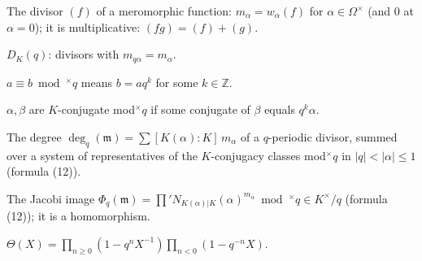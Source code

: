 \begin{definition}
\label{def:divisor-of}
\leanok
The divisor $(f)$ of a meromorphic function: $m_\alpha=w_\alpha(f)$ for $\alpha\in\Omega^\times$ (and $0$ at $\alpha=0$); it is multiplicative: $(fg)=(f)+(g)$.
\end{definition}

\begin{definition}
\label{def:Dq}
\leanok
$D_K(q)$: divisors with $m_{q\alpha}=m_\alpha$.
\end{definition}

\begin{definition}
\label{def:mod-times}
\leanok
$a\equiv b\bmod^\times q$ means $b=aq^k$ for some $k\in\mathbb Z$.
\end{definition}

\begin{definition}
\label{def:conj-mod-q}
\leanok
$\alpha,\beta$ are $K$-conjugate mod$^\times q$ if some conjugate of $\beta$ equals $q^k\alpha$.
\end{definition}

\begin{definition}
\label{def:deg-q}
\leanok
The degree $\deg_q(\mathfrak m)=\sum[K(\alpha):K]\,m_\alpha$ of a $q$-periodic divisor, summed over a system of representatives of the $K$-conjugacy classes mod$^\times q$ in $|q|<|\alpha|\le 1$ (formula (12)).
\end{definition}

\begin{definition}
\label{def:Phi-q}
\leanok
The Jacobi image $\Phi_q(\mathfrak m)=\prod' N_{K(\alpha)|K}(\alpha)^{m_\alpha}\bmod^\times q\in K^\times/q$ (formula (12)); it is a homomorphism.
\end{definition}

\begin{definition}
\label{def:theta}
\leanok
$\Theta(X)=\prod_{n\ge 0}(1-q^nX^{-1})\prod_{n<0}(1-q^{-n}X)$.
\end{definition}

